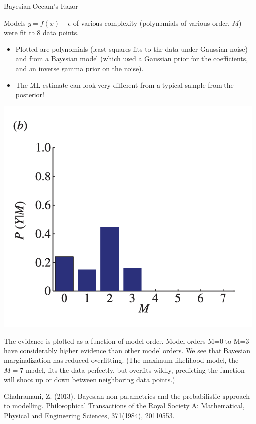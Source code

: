 \documentclass[10pt]{beamer}
\begin{document}
\begin{frame}{Bayesian Occam's Razor}
\begin{minipage}[t]{.47\textwidth}
Models $y = f(x) + \epsilon$ of  various complexity  \tiny (polynomials of various order, $M$) \scriptsize were fit to 8 data points. 
	\begin{itemize}
	\scriptsize
	\item  Plotted are   polynomials \tiny (least squares fits to the data under Gaussian noise) \scriptsize and  from a Bayesian model \tiny (which used a Gaussian prior for the coefficients, and an inverse gamma prior on the noise). \scriptsize
	\item The ML estimate can look very different from a typical sample from the posterior!  
	\end{itemize}
\end{minipage}
\hfill
\begin{minipage}[t]{.47\textwidth}
\begin{center}
\includegraphics[width=.7\textwidth]{images/occams_razor_b}
\end{center}
The evidence is plotted as a function of model order.  Model orders M=0 to M=3 have considerably higher evidence than other model orders.  We see that Bayesian marginalization has reduced overfitting.  (The maximum likelihood model, the $M=7$ model, fits the data perfectly, but overfits wildly, predicting the function will shoot up or down between neighboring data points.) 
\end{minipage}
\vfill

\hfill \tiny Ghahramani, Z. (2013). Bayesian non-parametrics and the probabilistic approach to modelling. Philosophical Transactions of the Royal Society A: Mathematical, Physical and Engineering Sciences, 371(1984), 20110553.
\end{frame}
\end{document}
